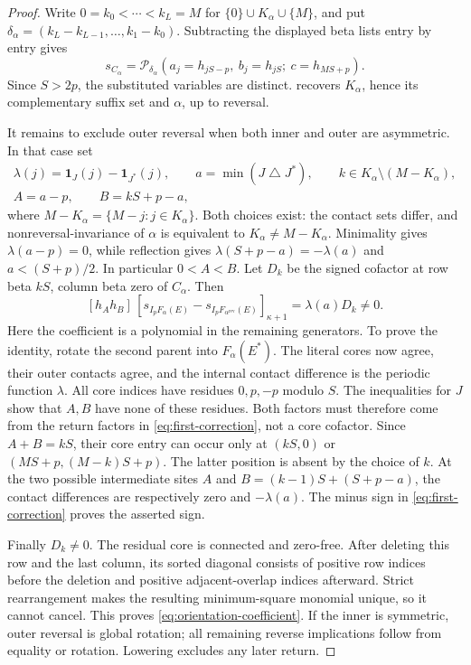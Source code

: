 \documentclass[11pt,a4paper]{amsart}
\numberwithin{equation}{section}
\theoremstyle{plain}
\theoremstyle{definition}
\begin{document}
\begin{proof}
Write \(0=k_0<\cdots<k_L=M\) for
\(\{0\}\cup K_\alpha\cup\{M\}\), and put
\(\delta_\alpha=(k_L-k_{L-1},\ldots,k_1-k_0)\).
Subtracting the displayed beta lists entry by entry gives
\begin{equation}\label{eq:balanced-word}
 s_{C_\alpha}=
 \mathcal P_{\delta_\alpha}
       (a_j=h_{jS-p},\ b_j=h_{jS};\ c=h_{MS+p}).
\end{equation}
Since \(S>2p\), the substituted variables are distinct.
 recovers \(K_\alpha\), hence its
complementary suffix set and \(\alpha\), up to reversal.

It remains to exclude outer reversal when both inner and outer are
asymmetric.  In that case set
\[
 \begin{gathered}
 \lambda(j)=\mathbf1_J(j)-\mathbf1_{J^*}(j),\qquad
 a=\min(J\mathbin{\triangle}J^*),\qquad
 k\in K_\alpha\setminus(M-K_\alpha),\\
 A=a-p,\qquad B=kS+p-a,
 \end{gathered}
\]
where \(M-K_\alpha=\{M-j:j\in K_\alpha\}\).
Both choices exist: the contact sets differ, and nonreversal-invariance
of \(\alpha\) is equivalent to \(K_\alpha\ne M-K_\alpha\).
Minimality gives \(\lambda(a-p)=0\), while reflection gives
\(\lambda(S+p-a)=-\lambda(a)\) and \(a<(S+p)/2\).
In particular \(0<A<B\).
Let \(D_k\) be the signed cofactor at row beta \(kS\),
column beta zero of \(C_\alpha\).  Then
\begin{equation}\label{eq:orientation-coefficient}
 [h_Ah_B]\,[s_{I_pF_\alpha(E)}
             -s_{I_pF_{\alpha^{\mathrm{rev}}}(E)}]_{\kappa+1}
       =\lambda(a)D_k\ne0.
\end{equation}
Here the coefficient is a polynomial in the remaining generators.
To prove the identity, rotate the second parent into \(F_\alpha(E^*)\).
The literal cores now agree, their outer contacts agree, and the internal
contact difference is the periodic function \(\lambda\).
All core indices have residues \(0,p,-p\) modulo \(S\).
The inequalities for \(J\) show that
\(A,B\) have none of these residues.  Both factors must therefore
come from the return factors in \eqref{eq:first-correction}, not a
core cofactor.  Since \(A+B=kS\), their core entry can occur
only at \((kS,0)\) or \((MS+p,(M-k)S+p)\).
The latter position is absent by the choice of \(k\).
At the two possible intermediate sites \(A\) and
\(B=(k-1)S+(S+p-a)\), the contact differences are respectively
zero and \(-\lambda(a)\).  The minus sign in
\eqref{eq:first-correction} proves the asserted sign.

Finally \(D_k\ne0\).  The residual core is connected and
zero-free.  After deleting this row and the last column, its sorted
diagonal consists of positive row indices before the deletion and
positive adjacent-overlap indices afterward.  Strict rearrangement
makes the resulting minimum-square monomial unique, so it cannot cancel.
This proves \eqref{eq:orientation-coefficient}.  If the inner is
symmetric, outer reversal is global rotation; all remaining reverse
implications follow from equality or rotation.  Lowering excludes any
later return.
\end{proof}
\end{document}
